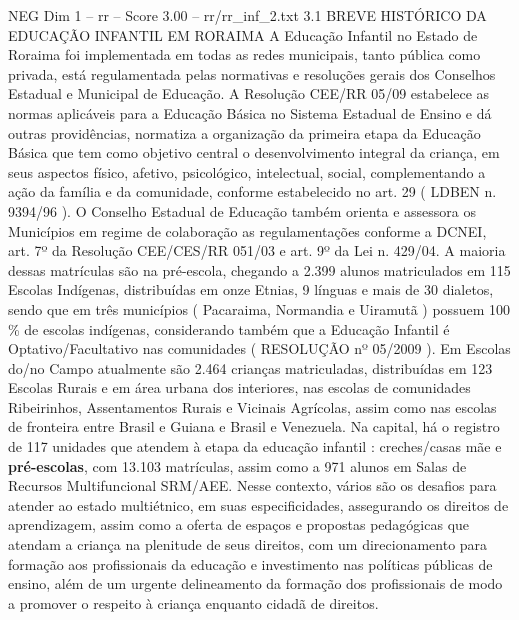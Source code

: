 \begin{textsample}{NEG Dim 1 – rr – Score 3.00 – rr/rr\_inf\_2.txt}  \label{ex:f1_neg_075}
3.1 BREVE HISTÓRICO DA EDUCAÇÃO INFANTIL EM RORAIMA A Educação Infantil no Estado de Roraima foi implementada em todas as redes municipais, tanto pública como privada, está regulamentada pelas normativas e resoluções gerais dos Conselhos Estadual e Municipal de Educação.
A Resolução CEE/RR 05/09 estabelece as normas aplicáveis para a Educação Básica no Sistema Estadual de Ensino e dá outras providências, normatiza a organização da primeira etapa da Educação Básica que tem como objetivo central o desenvolvimento integral da criança, em seus aspectos físico, afetivo, psicológico, intelectual, social, complementando a ação da família e da comunidade, conforme estabelecido no art. 29 ( LDBEN n. 9394/96 ).
O Conselho Estadual de Educação também orienta e assessora os Municípios em regime de colaboração as regulamentações conforme a DCNEI, art. 7º da Resolução CEE/CES/RR 051/03 e art. 9º da Lei n. 429/04.
A maioria dessas matrículas são na pré-escola, chegando a 2.399 alunos matriculados em 115 Escolas Indígenas, distribuídas em onze Etnias, 9 línguas e mais de 30 dialetos, sendo que em três municípios ( Pacaraima, Normandia e Uiramutã ) possuem 100 \% de escolas indígenas, considerando também que a Educação Infantil é Optativo/Facultativo nas comunidades ( RESOLUÇÃO nº 05/2009 ).
Em Escolas do/no Campo atualmente são 2.464 crianças matriculadas, distribuídas em 123 Escolas Rurais e em área urbana dos interiores, nas escolas de comunidades Ribeirinhos, Assentamentos Rurais e Vicinais Agrícolas, assim como nas escolas de fronteira entre Brasil e Guiana e Brasil e Venezuela.
Na capital, há o registro de 117 unidades que atendem à etapa da educação infantil : creches/casas mãe e \textbf{pré-escolas}, com 13.103 matrículas, assim como a 971 alunos em Salas de Recursos Multifuncional SRM/AEE.
Nesse contexto, vários são os desafios para atender ao estado multiétnico, em suas especificidades, assegurando os direitos de aprendizagem, assim como a oferta de espaços e propostas pedagógicas que atendam a criança na plenitude de seus direitos, com um direcionamento para formação aos profissionais da educação e investimento nas políticas públicas de ensino, além de um urgente delineamento da formação dos profissionais de modo a promover o respeito à criança enquanto cidadã de direitos.

\end{textsample}

